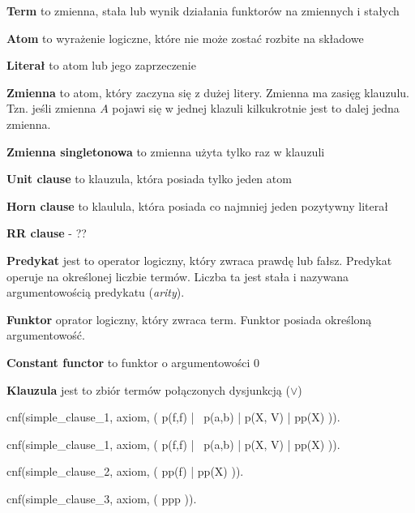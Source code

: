 \documentclass[a4paper,12pt]{article}
\begin{document}
\textbf{Term}
to zmienna, stała lub wynik działania funktorów na zmiennych i stałych

\textbf{Atom}
to wyrażenie logiczne, które nie może zostać rozbite na składowe


\textbf{Literał}
to atom lub jego zaprzeczenie

\textbf{Zmienna}
to atom, który zaczyna się z dużej litery. Zmienna ma zasięg klauzulu. Tzn. jeśli zmienna $A$ pojawi się w jednej klazuli kilkukrotnie jest to dalej jedna zmienna.

\textbf{Zmienna singletonowa}
to zmienna użyta tylko raz w klauzuli

\textbf{Unit clause}
to klauzula, która posiada tylko jeden atom

\textbf{Horn clause}
to klaulula, która posiada co najmniej jeden pozytywny literał

\textbf{RR clause} - ??

\textbf{Predykat}
jest to operator logiczny, który zwraca prawdę lub fałsz. Predykat operuje na określonej liczbie termów. Liczba ta jest stała i nazywana argumentowością predykatu (\textit{arity}).

\textbf{Funktor}
oprator logiczny, który zwraca term. Funktor posiada określoną argumentowość.

\textbf{Constant functor}
to funktor o argumentowości 0

\textbf{Klauzula}
jest to zbiór termów połączonych dysjunkcją ($\lor$)


\begin{tptpcode}
cnf(simple_clause_1, axiom,
    ( p(f,f) | ~p(a,b) | p(X, V) | pp(X) )).
 
\end{tptpcode}

\begin{tptpcode}
cnf(simple_clause_1, axiom,
    ( p(f,f) | ~p(a,b) | p(X, V) | pp(X) )).

cnf(simple_clause_2, axiom,
    ( pp(f) | pp(X) )).

cnf(simple_clause_3, axiom,
    ( ppp )).

\end{tptpcode}
\end{document}
